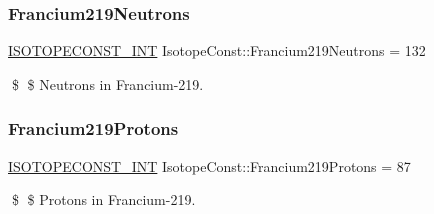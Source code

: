\subsubsection{\texorpdfstring{Francium219\+Neutrons}{Francium219Neutrons}}
{\footnotesize\ttfamily \mbox{\hyperlink{group___isotope_const-_macros_ga5f18360b3e99483a35c32d789e62621c}{I\+S\+O\+T\+O\+P\+E\+C\+O\+N\+S\+T\+\_\+\+I\+NT}} Isotope\+Const\+::\+Francium219\+Neutrons = 132}

\$ \$ Neutrons in Francium-\/219. \mbox{\label{group___isotope_const-_francium-_fr219_ga36b1c00aca3b3c350087bdb79ef518a7}} 
\subsubsection{\texorpdfstring{Francium219\+Protons}{Francium219Protons}}
{\footnotesize\ttfamily \mbox{\hyperlink{group___isotope_const-_macros_ga5f18360b3e99483a35c32d789e62621c}{I\+S\+O\+T\+O\+P\+E\+C\+O\+N\+S\+T\+\_\+\+I\+NT}} Isotope\+Const\+::\+Francium219\+Protons = 87}

\$ \$ Protons in Francium-\/219. 